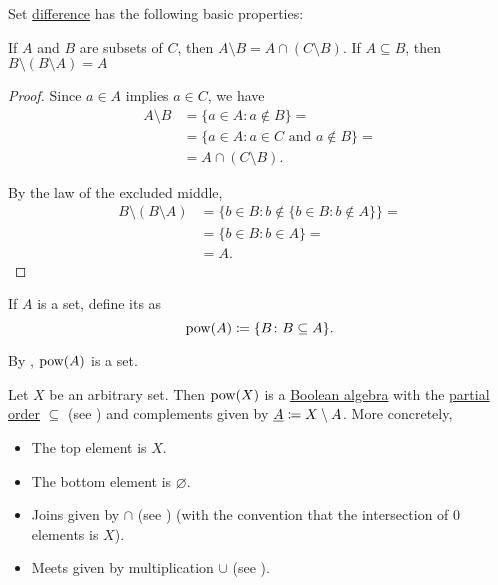 \begin{proposition}\label{thm:set_difference_properties}
  Set \hyperref[def:set_difference]{difference} has the following basic properties:
  \begin{PropEnum}
     If \( A \) and \( B \) are subsets of \( C \), then \( A \setminus B = A \cap (C \setminus B) \).
     If \( A \subseteq B \), then \( B \setminus (B \setminus A) = A \)
  \end{PropEnum}
\end{proposition}
\begin{proof}
   Since \( a \in A \) implies \( a \in C \), we have
  \begin{align*}
    A \setminus B
     & =
    \{ a \in A \colon a \not\in B \}
    =    \\ &=
    \{ a \in A \colon a \in C \text{ and } a \not\in B \}
    =    \\ &=
    A \cap (C \setminus B).
  \end{align*}

   By the law of the excluded middle,
  \begin{align*}
    B \setminus (B \setminus A)
     & =
    \{ b \in B \colon b \not\in \{ b \in B \colon b \not\in A \} \}
    =    \\ &=
    \{ b \in B \colon b \in A \}
    =    \\ &=
    A.
  \end{align*}
\end{proof}

\begin{definition}\label{def:power_set}
  If \( A \) is a set, define its  as
  \begin{equation*}
    \operatorname{pow}(A) \coloneqq \{ B \colon B \subseteq A \}.
  \end{equation*}

  By , \( \operatorname{pow}(A) \) is a set.
\end{definition}

\begin{proposition}\label{thm:subsets_form_boolean_algebra}
  Let \( X \) be an arbitrary set. Then \( \operatorname{pow}(X) \) is a \hyperref[def:boolean_algebra]{Boolean algebra} with the \hyperref[def:poset]{partial order} \( \subseteq \) (see ) and complements given by \( \underline{A} \coloneqq X \setminus A \). More concretely,
  \begin{itemize}
    \item The top element is \( X \).
    \item The bottom element is \( \varnothing \).
    \item Joins given by \( \cap \) (see ) (with the convention that the intersection of \( 0 \) elements is \( X \)).
    \item Meets given by multiplication \( \cup \) (see ).
  \end{itemize}
\end{proposition}

